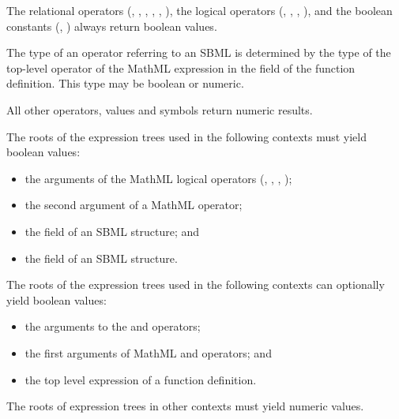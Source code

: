 The relational operators (, , ,
, , ), the logical operators
(, , , ), and the
boolean constants (, ) always return
boolean values.   

The type of an operator referring to an SBML \FunctionDefinition
is determined by the type of the top-level operator of the MathML
expression in the  field of the function definition.
This type may be boolean or numeric.

All other operators, values and symbols return numeric results.

The roots of the expression trees used in the following contexts
must yield boolean values:
\begin{itemize}

\item the arguments of the MathML logical operators (,
, , );

\item the second argument of a MathML  operator;

\item the  field of an SBML \Event structure; and

\item the  field of an SBML \Constraint structure.

\end{itemize}

The roots of the expression trees used in the following contexts can
optionally yield boolean values:
\begin{itemize}

\item the arguments to the  and  operators;

\item the first arguments of MathML  and 
operators; and

\item the top level expression of a function definition.

\end{itemize}

The roots of expression trees in other contexts must yield numeric
values.

